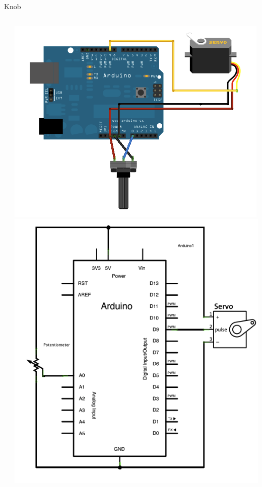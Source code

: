 \documentclass[compress]{beamer}
\begin{document}
\begin{frame}[fragile]{Knob}
\begin{columns}
\begin{column}{0.7\linewidth}
        \end{column}
        \begin{column}{0.3\linewidth}
            \begin{center}
                \includegraphics[width=0.35\paperheight]{knob_bb}\\
                \includegraphics[width=0.3\paperheight]{knob_schem}
            \end{center}
        \end{column}
    \end{columns}
\end{frame}
\end{document}
